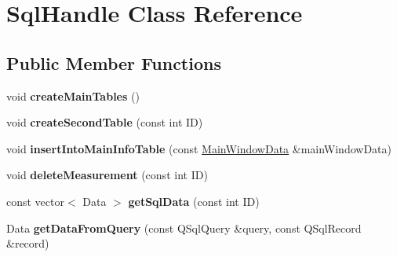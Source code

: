 \hypertarget{classSqlHandle}{\section{Sql\-Handle Class Reference}
\label{classSqlHandle}
}
\subsection*{Public Member Functions}
\begin{DoxyCompactItemize}
\item 
\hypertarget{classSqlHandle_a74881baa2b268e2507d361007ca3d071}{void {\bfseries create\-Main\-Tables} ()}\label{classSqlHandle_a74881baa2b268e2507d361007ca3d071}

\item 
\hypertarget{classSqlHandle_a09cc807b1fb5aeda615ba8081f66cc1f}{void {\bfseries create\-Second\-Table} (const int I\-D)}\label{classSqlHandle_a09cc807b1fb5aeda615ba8081f66cc1f}

\item 
\hypertarget{classSqlHandle_a7a0d2c81551b031837bbea9cf97b513e}{void {\bfseries insert\-Into\-Main\-Info\-Table} (const \hyperlink{structMainWindowData}{Main\-Window\-Data} \&main\-Window\-Data)}\label{classSqlHandle_a7a0d2c81551b031837bbea9cf97b513e}

\item 
\hypertarget{classSqlHandle_ac111d82dcd20a975ab64563313403c5f}{void {\bfseries delete\-Measurement} (const int I\-D)}\label{classSqlHandle_ac111d82dcd20a975ab64563313403c5f}

\item 
\hypertarget{classSqlHandle_a8cbd20e9edad986197ceec01897442e7}{const vector$<$ Data $>$ {\bfseries get\-Sql\-Data} (const int I\-D)}\label{classSqlHandle_a8cbd20e9edad986197ceec01897442e7}

\item 
\hypertarget{classSqlHandle_a9e63022701c72474a6baf13f581fbc02}{Data {\bfseries get\-Data\-From\-Query} (const Q\-Sql\-Query \&query, const Q\-Sql\-Record \&record)}\label{classSqlHandle_a9e63022701c72474a6baf13f581fbc02}

\end{DoxyCompactItemize}
